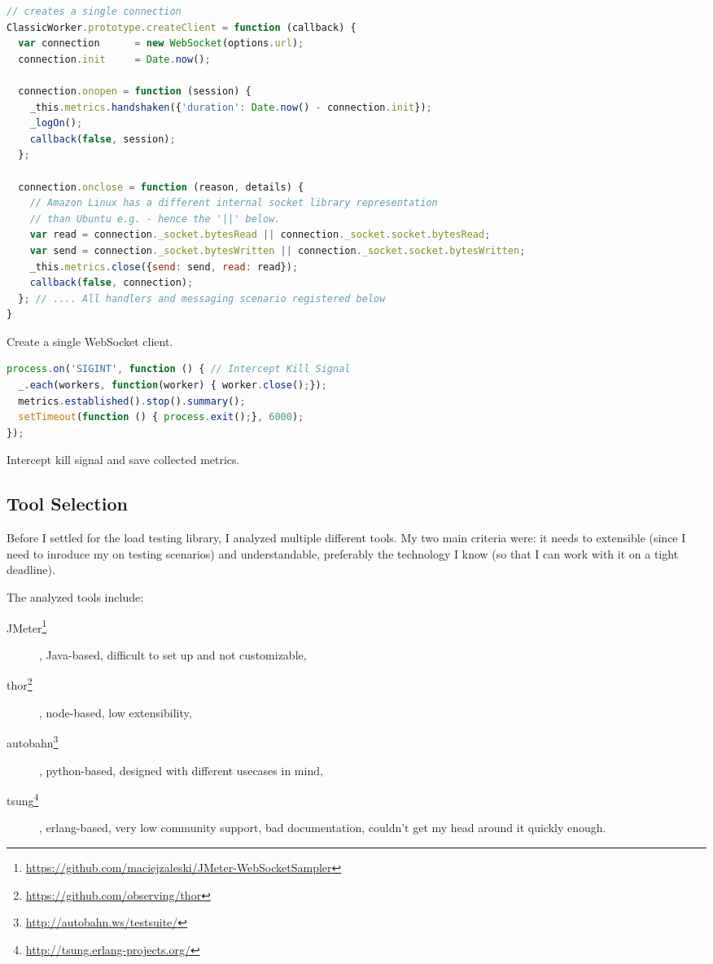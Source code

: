 \documentclass{uvamscse}
\begin{document}
\begin{sourcecode}[H]
\begin{lstlisting}[language=javascript]
// creates a single connection
ClassicWorker.prototype.createClient = function (callback) {
  var connection      = new WebSocket(options.url);
  connection.init     = Date.now();

  connection.onopen = function (session) {
    _this.metrics.handshaken({'duration': Date.now() - connection.init});
    _logOn();
    callback(false, session);
  };

  connection.onclose = function (reason, details) {
    // Amazon Linux has a different internal socket library representation
    // than Ubuntu e.g. - hence the '||' below.
    var read = connection._socket.bytesRead || connection._socket.socket.bytesRead;
    var send = connection._socket.bytesWritten || connection._socket.socket.bytesWritten;
    _this.metrics.close({send: send, read: read});
    callback(false, connection);
  }; // .... All handlers and messaging scenario registered below
}
\end{lstlisting}
\caption{Create a single WebSocket client.}
\label{lstlisting:loadtestexec3}
\end{sourcecode}

\begin{sourcecode}[H]
\begin{lstlisting}[language=javascript]
process.on('SIGINT', function () { // Intercept Kill Signal
  _.each(workers, function(worker) { worker.close();});
  metrics.established().stop().summary();
  setTimeout(function () { process.exit();}, 6000);
});

\end{lstlisting}
\caption{Intercept kill signal and save collected metrics.}
\label{lstlisting:loadtestexec4}
\end{sourcecode}


\subsection{Tool Selection}

Before I settled for the load testing library, I analyzed multiple different tools. My two main criteria were: it needs to extensible (since I need to inroduce my on testing scenarios) and understandable, preferably the technology I know (so that I can work with it on a tight deadline).

The analyzed tools include:
\begin{description}
  \item [JMeter\footnote{\url{https://github.com/maciejzaleski/JMeter-WebSocketSampler}}], Java-based, difficult to set up and not customizable,
  \item [thor\footnote{\url{https://github.com/observing/thor}}], node-based, low extensibility,
  \item [autobahn\footnote{\url{http://autobahn.ws/testsuite/}}], python-based, designed with different usecases in mind,
  \item [tsung\footnote{\url{http://tsung.erlang-projects.org/}}], erlang-based, very low community support, bad documentation, couldn't get my head around it quickly enough.
\end{description}
\end{document}
